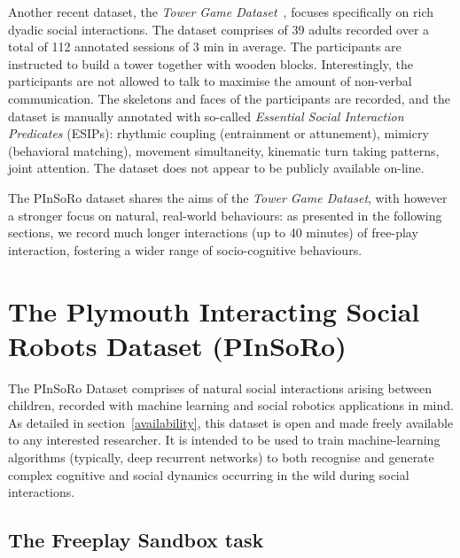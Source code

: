 \documentclass{article}
\begin{document}
Another recent dataset, the \emph{Tower Game Dataset}~\cite{salter2015tower},
focuses specifically on rich dyadic social interactions. The dataset comprises
of 39 adults recorded over a total of 112 annotated sessions of 3 min in
average. The participants are instructed to build a tower together with wooden
blocks. Interestingly, the participants are not allowed to talk to
maximise the amount of non-verbal communication. The skeletons and faces of the
participants are recorded, and the dataset is manually annotated with so-called
\emph{Essential Social Interaction Predicates} (ESIPs): rhythmic coupling
(entrainment or attunement), mimicry (behavioral matching), movement
simultaneity, kinematic turn taking patterns, joint attention. The dataset does
not appear to be publicly available on-line.

The PInSoRo dataset shares the aims of the \emph{Tower Game Dataset}, with
however a stronger focus on natural, real-world behaviours: as presented in the
following sections, we record much longer interactions (up to 40 minutes) of
free-play interaction, fostering a wider range of socio-cognitive behaviours.

\section{The Plymouth Interacting Social Robots Dataset (PInSoRo)}

The PInSoRo Dataset comprises of natural
social interactions arising between children, recorded with machine learning
and social robotics applications in mind. 
As detailed in section~\ref{availability}, this dataset is open and made freely
available to any interested researcher. It is intended to be used to train
machine-learning algorithms (typically, deep recurrent networks) to both
recognise and generate complex cognitive and social dynamics occurring in the
wild during social interactions.

\subsection{The Freeplay Sandbox task}
\end{document}
